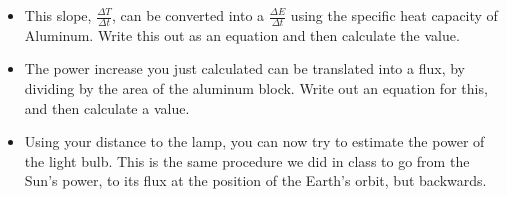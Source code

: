 \begin{itemize}
	\item This slope, $\frac{\Delta T}{\Delta t}$, can be converted into a $\frac{\Delta E}{\Delta t}$ using the specific heat capacity of Aluminum.  Write this out as an equation and then calculate the value.
	\item The power increase you just calculated can be translated into a flux, by dividing by the area of the aluminum block. Write out an equation for this, and then calculate a value.
	\item Using your distance to the lamp, you can now try to estimate the power of the light bulb.  This is the same procedure we did in class to go from the Sun's power, to its flux at the position of the Earth's orbit, but backwards.
	\end{itemize}






 